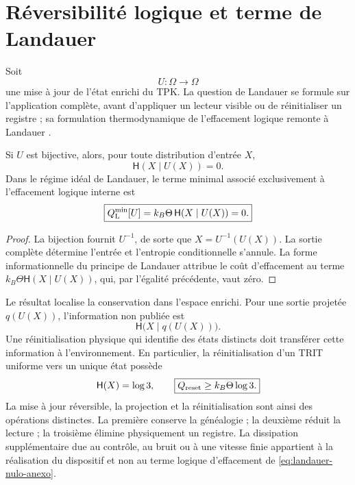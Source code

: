 \section{Réversibilité logique et terme de Landauer}

Soit
\[
 U:\Omega\longrightarrow\Omega
\]
une mise à jour de l'état enrichi du TPK. La question de Landauer se
formule sur l'application complète, avant d'appliquer un lecteur visible ou de réinitialiser
un registre ; sa formulation thermodynamique de l'effacement logique remonte à
Landauer \cite{Landauer1961}.

\begin{theorem}
\label{thm:landauer-nulo-tpk-anexo}
Si \(U\) est bijective, alors, pour toute distribution d'entrée \(X\),
\begin{equation}
 \mathsf H(X\mid U(X))=0.
 \label{eq:landauer-entropia-cero-anexo}
\end{equation}
Dans le régime idéal de Landauer, le terme minimal associé exclusivement à
l'effacement logique interne est
\begin{equation}
 \boxed{
 Q_{\rm L}^{\min}[U]
 =k_B\Theta\,\mathsf H(X\mid U(X))=0.}
 \label{eq:landauer-nulo-anexo}
\end{equation}
\end{theorem}

\begin{proof}
La bijection fournit \(U^{-1}\), de sorte que
\(X=U^{-1}(U(X))\). La sortie complète détermine l'entrée et l'entropie
conditionnelle s'annule. La forme informationnelle du principe de Landauer attribue
le coût d'effacement au terme \(k_B\Theta\mathsf H(X\mid U(X))\), qui, par
l'égalité précédente, vaut zéro.
\end{proof}

Le résultat localise la conservation dans l'espace enrichi. Pour une
sortie projetée \(q(U(X))\), l'information non publiée est
\begin{equation}
 \mathsf H\bigl(X\mid q(U(X))\bigr).
 \label{eq:informacion-proyeccion-anexo}
\end{equation}
Une réinitialisation physique qui identifie des états distincts doit transférer cette
information à l'environnement. En particulier, la réinitialisation d'un TRIT uniforme vers un unique
état possède
\[
 \mathsf H(X)=\log3,
 \qquad
 \boxed{Q_{\rm reset}\geq k_B\Theta\log3.}
\]
La mise à jour réversible, la projection et la réinitialisation sont ainsi des opérations
distinctes. La première conserve la généalogie ; la deuxième réduit la lecture ; la
troisième élimine physiquement un registre. La dissipation supplémentaire due au
contrôle, au bruit ou à une vitesse finie appartient à la réalisation du
dispositif et non au terme logique d'effacement de
\eqref{eq:landauer-nulo-anexo}.

